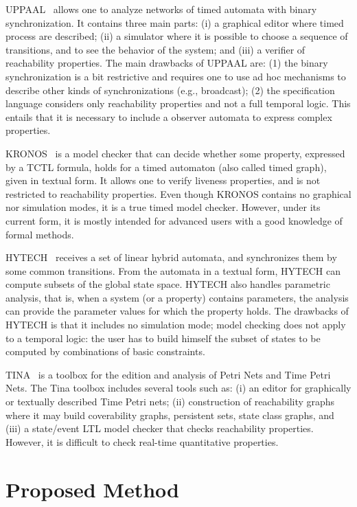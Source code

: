 \documentclass{llncs}
\begin{document}
UPPAAL~\cite{upaal97} allows one to analyze networks of timed automata with binary synchronization. 
It contains three main parts: (i) a graphical editor where timed process are described; 
(ii) a simulator where it is possible to choose a sequence of transitions, 
and to see the behavior of the system; and
(iii) a verifier of reachability properties. 
The main drawbacks of UPPAAL are: (1) the binary synchronization 
is a bit restrictive and requires one to use ad hoc mechanisms 
to describe other kinds of synchronizations (e.g., broadcast); 
(2) the specification language considers only reachability properties and not a full temporal logic.
This entails that it is necessary to include a observer automata to express complex properties. 

KRONOS~\cite{kronos97} is a model checker that can decide whether some property, 
expressed by a TCTL formula, holds for a timed automaton 
(also called timed graph), given in textual form. 
It allows one to verify liveness properties, 
and is not restricted to reachability properties. 
Even though KRONOS contains no graphical nor simulation modes,
it is a true timed model checker. 
However, under its current form, it is mostly intended for advanced users with a good knowledge of formal methods.

HYTECH~\cite{HyTech97} receives a set of linear hybrid automata, and synchronizes them by some common transitions. 
From the automata in a textual form, HYTECH can compute subsets of the global state space. 
HYTECH also handles parametric analysis, that is, when a system (or a property) contains parameters, 
the analysis can provide the parameter values for which the property holds. 
The drawbacks of HYTECH is that it includes no simulation mode; model checking does not apply to a temporal logic: 
the user has to build himself the subset of states to be computed by combinations of basic constraints. 

TINA~\cite{Tina06} is a toolbox for the edition and analysis of Petri Nets and Time Petri Nets. 
The Tina toolbox includes several tools such as: (i) an editor for graphically or textually described 
Time Petri nets; (ii) construction of reachability graphs where it may build coverability graphs, 
persistent sets, state class graphs, and (iii) a state/event LTL model checker that checks reachability properties.
However, it is difficult to check real-time quantitative properties.


\section {Proposed Method}
\end{document}
